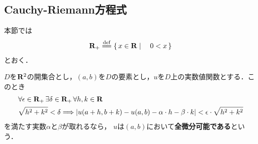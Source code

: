 \subsection{Cauchy-Riemann方程式}
	本節では
	\begin{align}
		\R_+ \defeq \Set{x \in \R}{0 < x}
	\end{align}
	とおく．
	
	\begin{screen}
		\begin{dfn}[全微分]\label{def:totally_differentiability}
			$D$を$\mathbf{R}^2$の開集合とし，$(a,b)$を$D$の要素とし，$u$を$D$上の実数値関数とする．このとき
			\begin{align}
				&\forall \epsilon \in \mathbf{R}_+\, \exists \delta \in \mathbf{R}_+\, \forall h,k \in \mathbf{R}\, \\
				&\sqrt{h^2 + k^2} < \delta \Longrightarrow
				\left|u(a+h,b+k) - u(a,b) - \alpha \cdot h - \beta \cdot k\right| 
				< \epsilon \cdot \sqrt{h^2 + k^2}
				\label{fom:def_totally_differentiability}
			\end{align}
			を満たす実数$\alpha$と$\beta$が取れるなら，
			$u$は$(a,b)$において{\bf 全微分可能である}という．
		\end{dfn}
	\end{screen}
	
